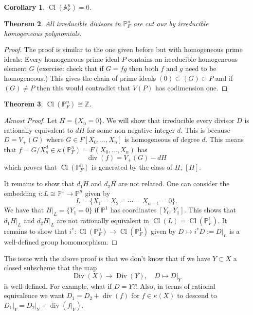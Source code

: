 \documentclass[12pt]{article}
\numberwithin{equation}{section}
\newtheorem{theorem}{Theorem}[subsection]
\newtheorem{corollary}[theorem]{Corollary}
\theoremstyle{definition}
\theoremstyle{remark}
\newcommand{\ZZ}{\mathbb{Z}}
\newcommand{\PP}{\mathbb{P}}
\renewcommand{\AA}{\mathbb{A}}
\newcommand{\Div}{\operatorname{Div}}
\renewcommand{\div}{\operatorname{div}}
\newcommand{\Cl}{\operatorname{Cl}}
\begin{document}
\begin{corollary}
	$\Cl(\AA^n_F)=0$.
\end{corollary}

\begin{theorem}
	All irreducible divisors in $\PP^n_F$ are cut our by irreducible homogeneous polynomials. 
\end{theorem}
\begin{proof}
	The proof is similar to the one given before but with homogeneous prime ideals:
	Every homogeneous prime ideal $P$ contains an irreducible homogeneous element $G$ (exercise: check that if $G=fg$ then both $f$ and $g$ need to be homogeneous.)
	This gives the chain of prime ideals $(0) \subset (G) \subset P$ and if $(G)\neq P$ then this would contradict that $V(P)$ has codimension one. 
\end{proof}

\begin{theorem}
	$\Cl(\PP^n_F)\cong \ZZ$.
\end{theorem}
\begin{proof}[Almost Proof]
	Let $H = \lbrace X_n = 0 \rbrace$.
	We will show that irreducible every divisor $D$ is rationally equivalent to $dH$ for some non-negative integer $d$. 
	This is because $D = V_+(G)$ where $G\in F[X_0,\ldots,X_n]$ is homogeneous of degree $d$. 
	This means that $f = G/X_n^d \in \kappa(\PP^n_F) = F(X_0,\ldots,X_n)$ has 
	$$ \div(f) = V_+(G) - d H $$
	which proves that $\Cl(\PP^n_F)$ is generated by the class of $H$, $[H]$.
	
	It remains to show that $d_1H$ and $d_2 H$ are not related.
	One can consider the embedding $i:L\cong \PP^1 \to \PP^n$ given by 
	 $$L  = \lbrace X_1=X_2=\cdots = X_{n-1}=0 \rbrace. $$
	We have that $H\vert_{L} = \lbrace Y_1 =0 \rbrace$ if $\PP^1$ has coordinates $[Y_0,Y_1]$. 
	This shows that $d_1 H\vert_L$ and $d_2 H\vert_L$ are not rationally equivalent in $\Cl(L)= \Cl(\PP^1_F)$.
	It remains to show that $i^*: \Cl(\PP^n_F) \to \Cl(\PP^1_F)$ given by $D \mapsto i^*D:=D\vert_L$ is a well-defined group homomorphism.
\end{proof}

The issue with the above proof is that we don't know that if we have $Y\subset X$ a closed subscheme that the map 
$$ \Div(X) \to \Div(Y), \quad D \mapsto D\vert_Y $$
is well-defined. For example, what if $D=Y$?! 
Also, in terms of rational equivalence we want $D_1 = D_2 + \div(f)$ for $f\in \kappa(X)$ to descend to $D_1\vert_Y = D_2\vert_Y + \div(f\vert_Y)$.
\end{document}
